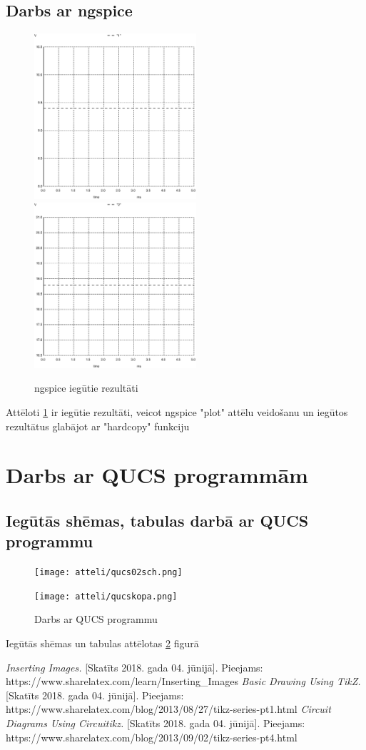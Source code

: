 \documentclass{report}
\begin{document}
\subsection{Darbs ar ngspice}
\begin{figure}[t]
\caption{ngspice iegūtie rezultāti}
\label{i:ngspice}
\includegraphics[width=6cm]{011.ps}
\includegraphics[width=6cm]{012.ps}
\end{figure}
Attēloti \ref{i:ngspice} ir iegūtie rezultāti, veicot ngspice "plot" attēlu veidošanu un iegūtos rezultātus glabājot ar "hardcopy" funkciju

\section{Darbs ar QUCS programmām}

\subsection{Iegūtās shēmas, tabulas darbā ar QUCS programmu}
\begin{figure}[ht]
\caption{Darbs ar QUCS programmu}
\label{i:qucs}
\texttt{[image: atteli/qucs02sch.png]}

\texttt{[image: atteli/qucskopa.png]}
\end{figure}
Iegūtās shēmas un tabulas attēlotas \ref{i:qucs} figurā

\begin{thebibliography}{9}
\textit{Inserting Images.} [Skatīts 2018. gada 04. jūnijā].
Pieejams: 
https://www.sharelatex.com/learn/Inserting\_{}Images
\textit{Basic Drawing Using TikZ.} [Skatīts 2018. gada 04. jūnijā].
Pieejams: 
https://www.sharelatex.com/blog/2013/08/27/tikz-series-pt1.html
\textit{Circuit Diagrams Using Circuitikz.} [Skatīts 2018. gada 04. jūnijā].
Pieejams: 
https://www.sharelatex.com/blog/2013/09/02/tikz-series-pt4.html

 
\end{thebibliography}
\end{document}
